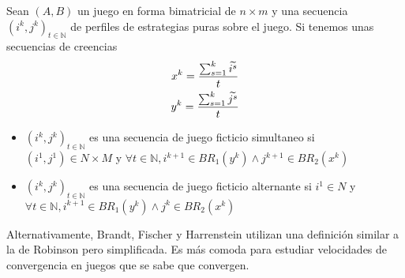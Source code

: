 \begin{definition} \label{def:fp:berger}
    Sean $(A, B)$ un juego en forma bimatricial de $n \times m$ y una secuencia $(i^k, j^k)_{t \in \mathbb{N}}$ de perfiles de estrategias puras sobre el juego. Si tenemos unas secuencias de creencias
    \begin{gather*}
        x^k= \frac{\sum^k_{s=1} \widetilde{i^s}}{t}  \\
        y^k= \frac{\sum^k_{s=1} \widetilde{j^s}}{t}
    \end{gather*}
    \begin{itemize}
        \item $({i^k}, j^k)_{t \in \mathbb{N}}$ es una secuencia de juego ficticio simultaneo si $(i^1, j^1) \in N \times M$ y $\forall t \in \mathbb{N}, i^{k+1} \in BR_1(y^k) \land j^{k+1} \in BR_2(x^k)$
        \item $(i^k, j^k)_{t \in \mathbb{N}}$ es una secuencia de juego ficticio alternante si $i^1 \in N$ y $\forall t \in \mathbb{N}, i^{k+1} \in BR_1(y^k) \land j^{k} \in BR_2(x^k)$
    \end{itemize}
\end{definition}


Alternativamente, Brandt, Fischer y Harrenstein utilizan una definición similar a la de Robinson \cite{robinson:zerosum} pero simplificada. Es más comoda para estudiar velocidades de convergencia en juegos que se sabe que convergen.

